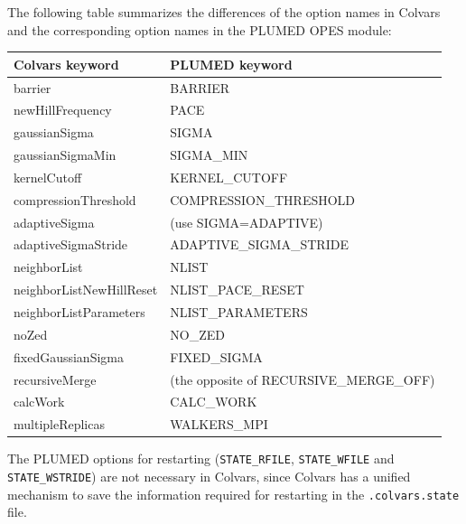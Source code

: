 The following table summarizes the differences of the option names in Colvars and the corresponding option names in the PLUMED OPES module:
\begin{table}[h]
\centering
\begin{tabular}{ll}
\textbf{Colvars keyword} & \textbf{PLUMED keyword} \\
\hline
barrier & BARRIER \\
newHillFrequency & PACE \\
gaussianSigma & SIGMA \\
gaussianSigmaMin & SIGMA\_MIN \\
kernelCutoff & KERNEL\_CUTOFF \\
compressionThreshold & COMPRESSION\_THRESHOLD \\
adaptiveSigma & (use SIGMA=ADAPTIVE) \\
adaptiveSigmaStride & ADAPTIVE\_SIGMA\_STRIDE \\
neighborList & NLIST \\
neighborListNewHillReset & NLIST\_PACE\_RESET \\
neighborListParameters & NLIST\_PARAMETERS \\
noZed & NO\_ZED \\
fixedGaussianSigma & FIXED\_SIGMA \\
recursiveMerge & (the opposite of RECURSIVE\_MERGE\_OFF) \\
calcWork & CALC\_WORK \\
multipleReplicas & WALKERS\_MPI
\end{tabular}
\end{table}

The PLUMED options for restarting (\texttt{STATE\_RFILE}, \texttt{STATE\_WFILE} and \texttt{STATE\_WSTRIDE}) are not necessary in Colvars, since Colvars has a unified mechanism to save the information required for restarting in the \texttt{.colvars.state} file.


